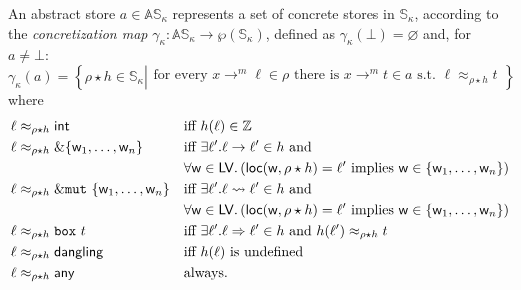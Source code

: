 \begin{definition}\label{def:concretization}
  An abstract store $a\in\mathbb{AS}_\kappa$ represents a set of concrete stores
  in $\mathbb{S}_\kappa$, according to the \emph{concretization map}
  $\gamma_\kappa:\mathbb{AS}_\kappa\to\wp(\mathbb{S}_\kappa)$, defined as
  $\gamma_\kappa(\bot)=\varnothing$ and, for $a\not=\bot$:
  \[
  \gamma_\kappa(a)=\left\{\rho\star h\in\mathbb{S}_\kappa\left|\begin{array}{l}
  \text{for every }x\to^m\ell\in\rho\text{ there is }x\to^m t\in a\text{ s.t.\ }\ell\approx_{\rho\star h}t
  \end{array}
  \right.\right\}
  \]
  where
  \begin{align*}
    \ell&\approx_{\rho\star h}\mathsf{int} && \text{iff $h(\ell)\in\mathbb{Z}$}\\
    \ell&\approx_{\rho\star h}\&\{\mathsf{w}_1,\ldots,\mathsf{w}_n\} && \text{iff $\exists\ell'.\ell\to\ell'\in h$ and}\\
    &&& \forall\mathsf{w}\in\mathsf{LV}.\left(\mathsf{loc}(\mathsf{w},\rho\star h)=\ell'\text{ implies }\mathsf{w}\in\{\mathsf{w}_1,\ldots,\mathsf{w}_n\}\right)\\
    \ell&\approx_{\rho\star h}\&\mathtt{mut}\ \{\mathsf{w}_1,\ldots,\mathsf{w}_n\} && \text{iff $\exists\ell'.\ell\leadsto\ell'\in h$ and}\\
    &&& \forall\mathsf{w}\in\mathsf{LV}.\left(\mathsf{loc}(\mathsf{w},\rho\star h)=\ell'\text{ implies }\mathsf{w}\in\{\mathsf{w}_1,\ldots,\mathsf{w}_n\}\right)\\
    \ell&\approx_{\rho\star h}\mathtt{box}\ t && \text{iff $\exists\ell'.\ell\Rightarrow\ell'\in h$ and $h(\ell')\approx_{\rho\star h}t$}\\
    \ell&\approx_{\rho\star h}\mathsf{dangling} && \text{iff $h(\ell)$ is undefined}\\
    \ell&\approx_{\rho\star h}\mathsf{any} && \text{always.}
  \end{align*}
\end{definition}


